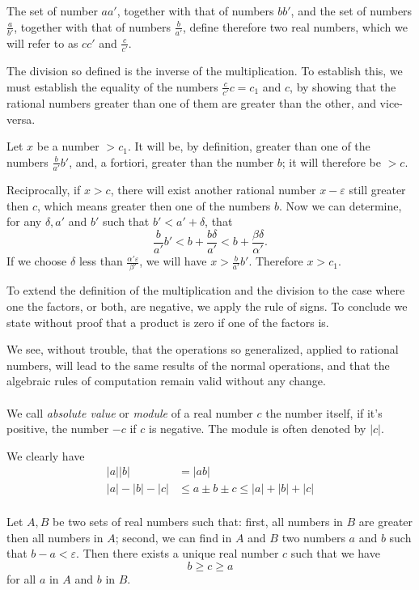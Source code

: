 \documentclass[10pt,letterpaper]{book}
\renewcommand\epsilon{\varepsilon}
\theoremstyle{definition}
\begin{document}
The set of number $aa'$, together with that of numbers $bb'$, and the set of numbers $\frac{a}{b'}$, together with that of numbers $\frac{b}{a'}$, define therefore two real numbers, which we will refer to as $cc'$ and $\frac{c}{c'}$.

The division so defined is the inverse of the multiplication. To establish this, we must establish the equality of the numbers $\frac{c}{c'}c=c_1$ and $c$, by showing that the rational numbers greater than one of them are greater than the other, and vice-versa.

Let $x$ be a number $>c_1$. It will be, by definition, greater than
one of the numbers $\frac{b}{a'}b'$, and, a fortiori, greater than the number $b$; it will therefore be $> c$.

Reciprocally, if $x > c$, there will exist another rational number $x-\epsilon$ still greater then $c$, which means greater then one of the numbers $b$. Now we can determine, for any $\delta, a'$ and $b'$ such that $b'<a'+\delta$, that
\[
  \frac{b}{a'}b'<b+\frac{b\delta}{a'}<b+\frac{\beta\delta}{\alpha'}.
\]
If we choose $\delta$ less than $\frac{\alpha'\epsilon}{\beta'}$, we will have $x>\frac{b}{a'}b'$. Therefore $x > c_1$.

To extend the definition of the multiplication and the division to the case where one the factors, or both, are negative, we apply the rule of signs. To conclude we state without proof that a product is zero if one of the factors is.

We see, without trouble, that the operations so generalized, applied to rational numbers, will lead to the same results of the normal operations, and that the algebraic rules of computation remain valid without any change.

\paragraph{} We call \textit{absolute value} or \textit{module} of a real number $c$ the number itself, if it's positive, the number $-c$ if $c$ is negative. The module is often denoted by $|c|$. 

We clearly have
\begin{align*}
  |a||b| &= |ab| \\
  |a|-|b|-|c| &\leq a \pm b \pm c \leq |a|+|b|+|c|
\end{align*}

\paragraph{} Let $A,B$ be two sets of real numbers such that: first, all numbers in $B$ are greater then all numbers in $A$; second, we can find in $A$ and $B$ two numbers $a$ and $b$ such that $b-a<\epsilon$. Then there exists a unique real number $c$ such that we have
\[
  b\geq c \geq a
\]
for all $a$ in $A$ and $b$ in $B$.
\end{document}
